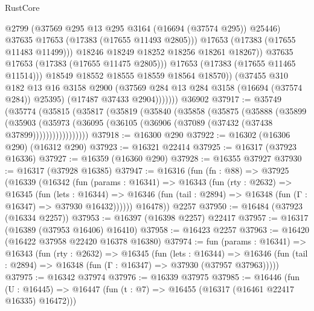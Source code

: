 \begin{lexlean}{RustCore}
\begin{coremodule}
                              @2799
                              (@37569 @295 @13 @295 @3164 (@16694 (@37574 @295)) @25446)
                              @37635
                              @17653
                              (@17383 (@17655 @11493 @2805)))
                            @17653
                            (@17383 (@17655 @11483 @11499)))
                          @18246
                          @18249
                          @18252
                          @18256
                          @18261
                          @18267))
                      @37635
                      @17653
                      (@17383 (@17655 @11475 @2805)))
                    @17653
                    (@17383 (@17655 @11465 @11514)))
                  @18549
                  @18552
                  @18555
                  @18559
                  @18564
                  @18570))
              (@37455
                @310
                @182
                @13
                @16
                @3158
                @2900
                (@37569 @284 @13 @284 @3158 (@16694 (@37574 @284)) @25395)
                (@17487 @37433 @2904)))))))
    @36902
@37917 := @35749
    (@35774
      (@35815
        (@35817
          (@35819
            (@35840
              (@35858
                (@35875
                  (@35888
                    (@35899
                      (@35903
                        (@35973
                          (@36095 (@36105 (@36906 (@37089 (@37432 (@37438 @37899)))))))))))))))))
@37918 := @16300 @290
@37922 := @16302 (@16306 @290) (@16312 @290)
@37923 := @16321 @22414
@37925 := @16317 (@37923 @16336)
@37927 := @16359 (@16360 @290)
@37928 := @16355 @37927
@37930 := @16317 (@37928 @16385)
@37947 := @16316
    (fun (fn : @88) =>
    @37925
      (@16339
        (@16342
          (fun (params : @16341) =>
          @16343
            (fun (rty : @2632) =>
            @16345
              (fun (lets : @16344) =>
              @16346 (fun (tail : @2894) => @16348 (fun (Γ : @16347) => @37930 @16432))))))
        @16478))
    @2257
@37950 := @16484 (@37923 (@16334 @2257))
@37953 := @16397 (@16398 @2257) @22417
@37957 := @16317 (@16389 (@37953 @16406) @16410)
@37958 := @16423 @2257
@37963 := @16420 (@16422 @37958 @22420 @16378 @16380)
@37974 := fun (params : @16341) =>
  @16343
    (fun (rty : @2632) =>
    @16345
      (fun (lets : @16344) =>
      @16346 (fun (tail : @2894) => @16348 (fun (Γ : @16347) => @37930 (@37957 @37963)))))
@37975 := @16342 @37974
@37976 := @16339 @37975
@37985 := @16446
    (fun (U : @16445) => @16447 (fun (t : @7) => @16455 (@16317 (@16461 @22417 @16335) @16472)))

\end{coremodule}
\end{lexlean}

